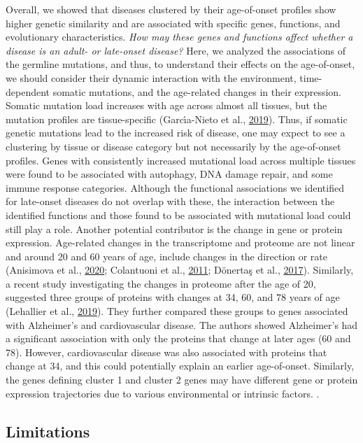 \documentclass[12pt,twoside]{unicam}
\begin{document}
Overall, we showed that diseases clustered by their age-of-onset profiles show higher genetic similarity and are associated with specific genes, functions, and evolutionary characteristics. \emph{How may these genes and functions affect whether a disease is an adult- or late-onset disease?} Here, we analyzed the associations of the germline mutations, and thus, to understand their effects on the age-of-onset, we should consider their dynamic interaction with the environment, time-dependent somatic mutations, and the age-related changes in their expression. Somatic mutation load increases with age across almost all tissues, but the mutation profiles are tissue-specific (Garcı́a-Nieto et al., \protect\hyperlink{ref-Garcia-Nieto2019}{2019}). Thus, if somatic genetic mutations lead to the increased risk of disease, one may expect to see a clustering by tissue or disease category but not necessarily by the age-of-onset profiles. Genes with consistently increased mutational load across multiple tissues were found to be associated with autophagy, DNA damage repair, and some immune response categories. Although the functional associations we identified for late-onset diseases do not overlap with these, the interaction between the identified functions and those found to be associated with mutational load could still play a role. Another potential contributor is the change in gene or protein expression. Age-related changes in the transcriptome and proteome are not linear and around 20 and 60 years of age, include changes in the direction or rate (Anisimova et al., \protect\hyperlink{ref-Anisimova2020}{2020}; Colantuoni et al., \protect\hyperlink{ref-Colantuoni2011}{2011}; Dönertaş et al., \protect\hyperlink{ref-Donertas2017}{2017}). Similarly, a recent study investigating the changes in proteome after the age of 20, suggested three groups of proteins with changes at 34, 60, and 78 years of age (Lehallier et al., \protect\hyperlink{ref-Lehallier2019}{2019}). They further compared these groups to genes associated with Alzheimer's and cardiovascular disease. The authors showed Alzheimer's had a significant association with only the proteins that change at later ages (60 and 78). However, cardiovascular disease was also associated with proteins that change at 34, and this could potentially explain an earlier age-of-onset. Similarly, the genes defining cluster 1 and cluster 2 genes may have different gene or protein expression trajectories due to various environmental or intrinsic factors. .

\hypertarget{limitations-1}{%
\subsection{Limitations}\label{limitations-1}}
\end{document}
